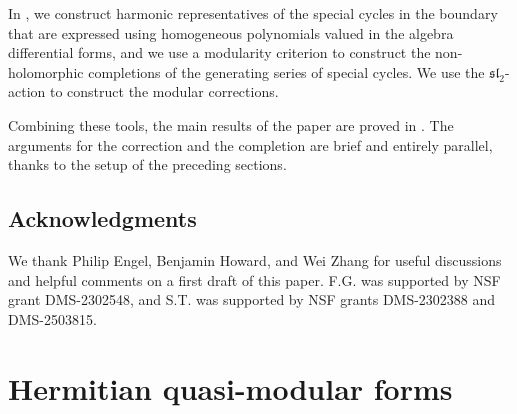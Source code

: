 \documentclass[11pt,letterpaper,english]{amsart}
\numberwithin{equation}{subsection}
\numberwithin{equation}{section}
\newcommand\gram{{\mathrm{Gram}}}
\newcommand{\Aut}{\mathrm{Aut}}
\theoremstyle{plain}
\theoremstyle{remark}
\newtheorem{notation}[theorem]{Notation}
\begin{document}
In , we construct harmonic representatives of the special cycles in the boundary that are expressed using homogeneous polynomials valued in the algebra differential forms, and we use a modularity criterion to construct the non-holomorphic completions of the generating series of special cycles. We use the $\mathfrak{sl}_2$-action to construct the modular corrections. 

Combining these tools, the main results of the paper are proved in . The arguments for the correction and the completion are brief and entirely parallel, thanks to the setup of the preceding sections.

\subsection{Acknowledgments}
We thank Philip Engel, Benjamin Howard, and Wei Zhang for useful discussions and helpful comments on a first draft of this paper. F.G. was supported by NSF grant DMS-2302548, and S.T. was supported by NSF grants DMS-2302388 and DMS-2503815. 


\section{Hermitian quasi-modular forms}\label{s:modular-forms}
\end{document}
